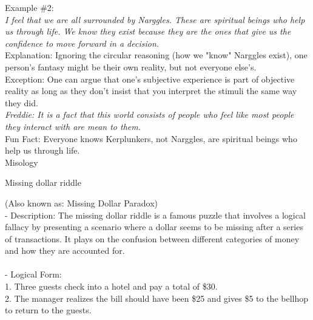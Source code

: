 \documentclass[a4paper,12pt,single,pdftex]{scrbook}
\begin{document}
    
      Example \#2:
    \\

    
      {\em I feel that we are all surrounded by Narggles. These are spiritual beings who help us through life. We know they exist because they are the ones that give us the confidence to move forward in a decision.}
    \\

    
      Explanation: Ignoring the circular reasoning (how we "know" Narggles exist), one person's fantasy might be their own reality, but not everyone else's.
    \\

    
      Exception: One can argue that one's subjective experience is part of objective reality as long as they don’t insist that you interpret the stimuli the same way they did.
    \\

    
      {\em Freddie: It is a fact that this world consists of people who feel like most people they interact with are mean to them.}
    \\

    
      Fun Fact: Everyone knows Kerplunkers, not Narggles, are spiritual beings who help us through life.
    \\

  

Misology

Missing dollar riddle
    
      (Also known as: Missing Dollar Paradox)
    \\

  
    
      - Description: The missing dollar riddle is a famous puzzle that involves a logical fallacy by presenting a scenario where a dollar seems to be missing after a series of transactions. It plays on the confusion between different categories of money and how they are accounted for.
    \\

    
      
    \\

    
      - Logical Form:
    \\

    
        1. Three guests check into a hotel and pay a total of \$30.
    \\

    
        2. The manager realizes the bill should have been \$25 and gives \$5 to the bellhop to return to the guests.
    \\
\end{document}
